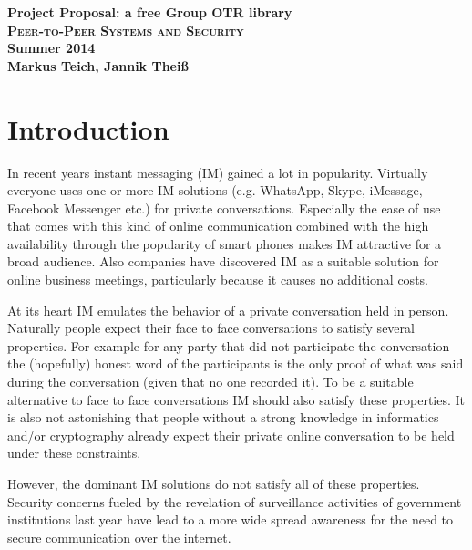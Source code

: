 

\title{}
\author{Markus Teich, Jannik Theiß}
\date{\today}



\begin{center}
\huge \textbf{Project Proposal: a free Group OTR library} \\
\vspace{2cm}
\LARGE\textbf{\textsc{Peer-to-Peer Systems and Security}}\\
\vspace{0.5cm}
\textbf{Summer 2014}\\
\textbf{Markus Teich, Jannik Theiß}
\vspace{3.5cm}
\end{center}


\section{Introduction}
In recent years instant messaging (IM) gained a lot in popularity. Virtually everyone uses one or more IM solutions (e.g. WhatsApp, Skype, iMessage, Facebook Messenger etc.) for private conversations. Especially the ease of use that comes with this kind of online communication combined with the high availability through the popularity of smart phones makes IM attractive for a broad audience. Also companies have discovered IM as a suitable solution for online business meetings, particularly because it causes no additional costs.

At its heart IM emulates the behavior of a private conversation held in person. Naturally people expect their face to face conversations to satisfy several properties. For example for any party that did not participate the conversation the (hopefully) honest word of the participants is the only proof of what was said during the conversation (given that no one recorded it). To be a suitable alternative to face to face conversations IM should also satisfy these properties. It is also not astonishing that people without a strong knowledge in informatics and/or cryptography already expect their private online conversation to be held under these constraints.


However, the dominant IM solutions do not satisfy all of these properties. Security concerns fueled by the revelation of surveillance activities of government institutions last year have lead to a more wide spread awareness for the need to secure communication over the internet.


